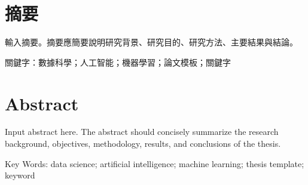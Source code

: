 \chapter*{摘要}
{}

輸入摘要。摘要應簡要說明研究背景、研究目的、研究方法、主要結果與結論。

\vspace{1.0cm}

\noindent 關鍵字：數據科學；人工智能；機器學習；論文模板；關鍵字

\clearpage
\chapter*{Abstract}
{}

Input abstract here. The abstract should concisely summarize the research background, objectives, methodology, results, and conclusions of the thesis.

\vspace{1.0cm}

\noindent Key Words: data science; artificial intelligence; machine learning; thesis template; keyword
